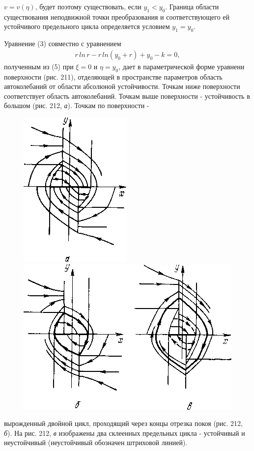 \documentclass{article}
\begin{document}
$v=v(\eta)$, будет поэтому существовать,
если $y_{1}<y_{0}$. Граница области существования
неподвижной точки преобразования
и соответствующего ей устойчивого
предельного цикла определяется
условием $y_{1}=y_{0}$.

Уравнение (3) совместно с уравнением
\begin{gather}
r \, ln \, r - r \, ln(y_{0}+r)+y_{0}-k=0,
\end{gather}
полученным из (5) при $\xi=0$ и $\eta=y_{0}$,
дает в параметрической форме уравнени
поверхности (рис. 211), отделяющей в пространстве параметров
область автоколебаний от области абсолюной устойчивости.
Точкам ниже поверхности соответствует область
автоколебаний. Точкам выше поверхности - устойчивость
в большом (рис. 212, \textit{а}). Точкам по поверхности - 
\begin{figure}[h]

\centering

\includegraphics[width=0.3\linewidth]{../img/img212__1.png}
\includegraphics[width=0.6\linewidth]{../img/img212__2.png}

\setcounter{figure}{1}
\renewcommand{\thefigure}{212}

\caption{}

\label{ris:image}



\end{figure}
вырожденный двойной цикл, проходящий через концы отрезка покоя
(рис. 212, \textit{б}). На рис. 212, \textit{в} изображены два склеенных предельных
цикла - устойчивый и неустойчивый (неустойчивый обозначен
штриховой линией).
\end{document}
